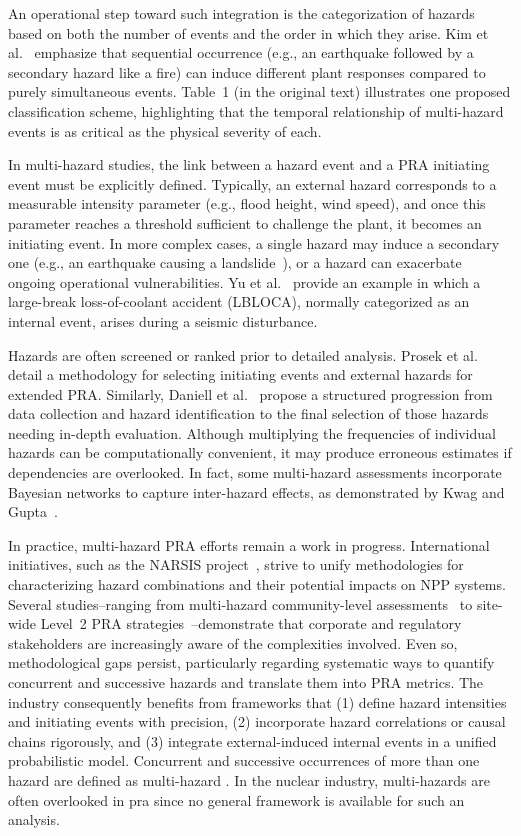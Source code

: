 An operational step toward such integration is the categorization of hazards based on both the number of events and the order in which they arise. Kim et al.~\cite{Kim2019PRELIMINARY} emphasize that sequential occurrence (e.g., an earthquake followed by a secondary hazard like a fire) can induce different plant responses compared to purely simultaneous events. Table~1 (in the original text) illustrates one proposed classification scheme, highlighting that the temporal relationship of multi-hazard events is as critical as the physical severity of each.

In multi-hazard studies, the link between a hazard event and a PRA initiating event must be explicitly defined. Typically, an external hazard corresponds to a measurable intensity parameter (e.g., flood height, wind speed), and once this parameter reaches a threshold sufficient to challenge the plant, it becomes an initiating event. In more complex cases, a single hazard may induce a secondary one (e.g., an earthquake causing a landslide~\cite{Kwag2018Development}), or a hazard can exacerbate ongoing operational vulnerabilities. Yu et al.~\cite{Yu2015Large} provide an example in which a large-break loss-of-coolant accident (LBLOCA), normally categorized as an internal event, arises during a seismic disturbance.

Hazards are often screened or ranked prior to detailed analysis. Prosek et al.~\cite{Prosek2017Methodology} detail a methodology for selecting initiating events and external hazards for extended PRA. Similarly, Daniell et al.~\cite{Daniell2019Review} propose a structured progression from data collection and hazard identification to the final selection of those hazards needing in-depth evaluation. Although multiplying the frequencies of individual hazards can be computationally convenient, it may produce erroneous estimates if dependencies are overlooked. In fact, some multi-hazard assessments incorporate Bayesian networks to capture inter-hazard effects, as demonstrated by Kwag and Gupta~\cite{Kwag2017Probabilistic}.

In practice, multi-hazard PRA efforts remain a work in progress. International initiatives, such as the NARSIS project~\cite{Home}, strive to unify methodologies for characterizing hazard combinations and their potential impacts on NPP systems. Several studies--ranging from multi-hazard community-level assessments~\cite{Li2009Ranking} to site-wide Level~2 PRA strategies~\cite{Cooper2013What}--demonstrate that corporate and regulatory stakeholders are increasingly aware of the complexities involved. Even so, methodological gaps persist, particularly regarding systematic ways to quantify concurrent and successive hazards and translate them into PRA metrics. The industry consequently benefits from frameworks that (1) define hazard intensities and initiating events with precision, (2) incorporate hazard correlations or causal chains rigorously, and (3) integrate external-induced internal events in a unified probabilistic model.
Concurrent and successive occurrences of more than one hazard are defined as multi-hazard \cite{Choi2021review}. In the nuclear industry, multi-hazards are often overlooked in \acrshort{pra} since no general framework is available for such an analysis.

